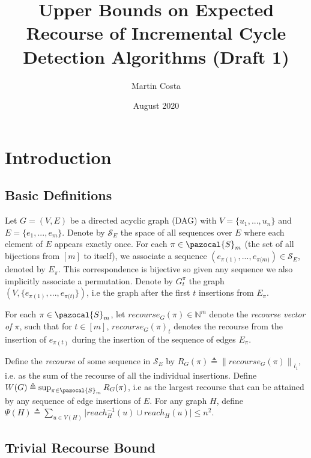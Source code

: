 \documentclass{article}
\title{Upper Bounds on Expected Recourse of Incremental Cycle Detection Algorithms (Draft 1)}
\author{Martin Costa}
\date{August 2020}
\newcommand{\norm}[1]{\left\lVert#1\right\rVert}
\begin{document}
\maketitle

\section{Introduction}

\subsection{Basic Definitions}

Let $G=(V,E)$ be a directed acyclic graph (DAG) with $V=\{ u_{1},...,u_{n}\}$ and $E=\{ e_{1},...,e_{m}\}$. Denote by $\mathcal{S}_{E}$ the space of all sequences over $E$ where each element of $E$ appears exactly once. For each $\pi \in \pazocal{S}_{m}$ (the set of all bijections from $[m]$ to itself), we associate a sequence $(e_{\pi(1)},...,e_{\pi{(m})})\in \mathcal{S}_{E}$, denoted by $E_{\pi}$. This correspondence is bijective so given any sequence we also implicitly associate a permutation. Denote by $G^{\pi}_{t}$ the graph $(V, \{ e_{\pi(1)},...,e_{\pi{(t})} \})$, i.e the graph after the first $t$ insertions from $E_{\pi}$.

For each $\pi \in \pazocal{S}_{m}$, let $recourse_{G}(\pi) \in \mathbb{N}^{m}$ denote the \textit{recourse vector of $\pi$}, such that for $t \in [m]$, $recourse_{G}(\pi)_{t}$ denotes the recourse from the insertion of $e_{\pi(t)}$ during the insertion of the sequence of edges $E_{\pi}$.

Define the \textit{recourse} of some sequence in $\mathcal{S}_{E}$ by $R_{G}(\pi) \triangleq \norm{recourse_{G}(\pi)}_{l_{1}}$, i.e. as the sum of the recourse of all the individual insertions. Define $W(G) \triangleq \sup_{\pi \in \pazocal{S}_{m}} {R_{G}(\pi)}$, i.e as the largest recourse that can be attained by any sequence of edge insertions of $E$. For any graph $H$, define $\Psi(H) \triangleq \sum_{u \in V(H)}\vert reach_{H}^{-1}(u) \cup reach_{H}(u) \vert \leq n^{2}$.

\subsection{Trivial Recourse Bound}
\end{document}
